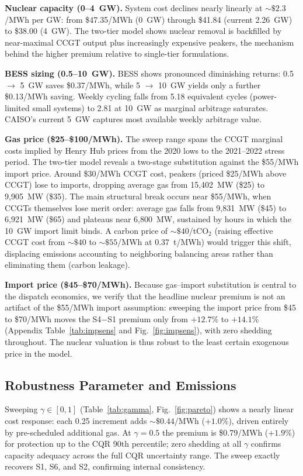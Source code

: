 \documentclass[preprint,12pt,authoryear]{elsarticle}
\begin{document}
\textbf{Nuclear capacity (0--4~GW).} System cost declines nearly linearly at ${\sim}\$2.3$/MWh per GW: from \$47.35/MWh (0~GW) through \$41.84 (current 2.26~GW) to \$38.00 (4~GW). The two-tier model shows nuclear removal is backfilled by near-maximal CCGT output plus increasingly expensive peakers, the mechanism behind the higher premium relative to single-tier formulations.

\textbf{BESS sizing (0.5--10~GW).} BESS shows pronounced diminishing returns: 0.5 $\to$ 5~GW saves \$0.37/MWh, while 5 $\to$ 10~GW yields only a further \$0.13/MWh saving. Weekly cycling falls from 5.18 equivalent cycles (power-limited small systems) to 2.81 at 10~GW as marginal arbitrage saturates. CAISO's current 5~GW captures most available weekly arbitrage value.

\textbf{Gas price (\$25--\$100/MWh).} The sweep range spans the CCGT marginal costs implied by Henry Hub prices from the 2020 lows to the 2021--2022 stress period. The two-tier model reveals a two-stage substitution against the \$55/MWh import price. Around \$30/MWh CCGT cost, peakers (priced \$25/MWh above CCGT) lose to imports, dropping average gas from 15{,}402~MW (\$25) to 9{,}905~MW (\$35). The main structural break occurs near \$55/MWh, when CCGTs themselves lose merit order: average gas falls from 9{,}831~MW (\$45) to 6{,}921~MW (\$65) and plateaus near 6{,}800~MW, sustained by hours in which the 10~GW import limit binds. A carbon price of ${\sim}\$40$/tCO$_2$ (raising effective CCGT cost from ${\sim}\$40$ to ${\sim}\$55$/MWh at 0.37~t/MWh) would trigger this shift, displacing emissions accounting to neighboring balancing areas rather than eliminating them (carbon leakage).

\textbf{Import price (\$45--\$70/MWh).} Because gas--import substitution is central to the dispatch economics, we verify that the headline nuclear premium is not an artifact of the \$55/MWh import assumption: sweeping the import price from \$45 to \$70/MWh moves the S4$-$S1 premium only from $+12.7\%$ to $+14.1\%$ (Appendix Table~\ref{tab:impsens} and Fig.~\ref{fig:impsens}), with zero shedding throughout. The nuclear valuation is thus robust to the least certain exogenous price in the model.

\subsection{Robustness Parameter and Emissions}
\label{sec:gamma}

Sweeping $\gamma \in [0,1]$ (Table~\ref{tab:gamma}, Fig.~\ref{fig:pareto}) shows a nearly linear cost response: each 0.25 increment adds ${\sim}\$0.44$/MWh ($+1.0\%$), driven entirely by pre-scheduled additional gas. At $\gamma = 0.5$ the premium is \$0.79/MWh ($+1.9\%$) for protection up to the CQR 90th percentile; zero shedding at all $\gamma$ confirms capacity adequacy across the full CQR uncertainty range. The sweep exactly recovers S1, S6, and S2, confirming internal consistency.
\end{document}
